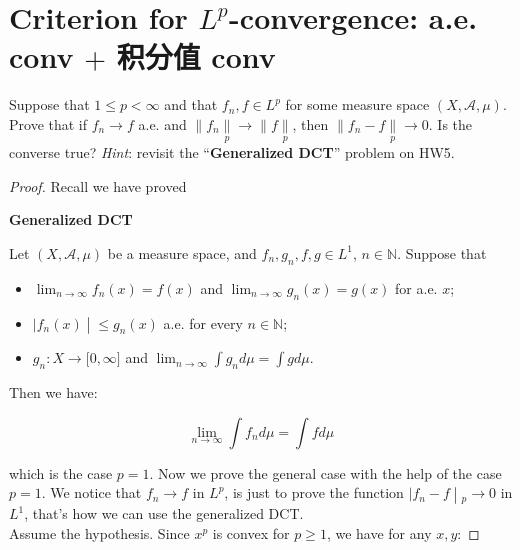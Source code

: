 \documentclass{qlnotes-export}
\begin{document}
\section{\texorpdfstring{Criterion for \(L^{p}\)-convergence: a.e. conv \(+\) 积分值 conv}{Criterion for L\^{}\{p\}-convergence: a.e. conv + 积分值 conv}}

Suppose that \(1 \leq p < \infty\) and that \(f_{n},f \in L^{p}\) for some measure space \((X,\mathcal{A},\mu)\). Prove that if \(f_{n}\rightarrow f\) a.e. and \(\parallel f_{n}\underset{p}{\parallel}\rightarrow \parallel f\underset{p}{\parallel}\), then \(\parallel f_{n} - f\underset{p}{\parallel}\rightarrow 0\). Is the converse true? \emph{Hint}: revisit the ``\textbf{Generalized DCT}'' problem on HW5.

\begin{proof}

Recall we have proved

\begin{theorem}{\protect{}\label{kn-generalized-dct}{\textbf{Generalized
DCT}}}

Let \((X,\mathcal{A},\mu)\) be a measure space, and \(f_{n},g_{n},f,g \in L^{1}\), \(n \in {\mathbb{N}}\). Suppose that

\begin{itemize}
\item
  \(\lim_{n\rightarrow\infty}f_{n}(x) = f(x)\) and \(\lim_{n\rightarrow\infty}g_{n}(x) = g(x)\) for a.e. \(x\);
\item
  \(\left. |f_{n}(x) \middle| \leq g_{n}(x) \right.\) a.e. for every \(n \in {\mathbb{N}}\);
\item
  \(g_{n}:X\rightarrow\lbrack 0,\infty\rbrack\) and \(\lim_{n\rightarrow\infty}\int g_{n} d\mu = \int g d\mu\).
\end{itemize}

Then we have:

\[\lim\limits_{n\rightarrow\infty}\int f_{n} d\mu = \int f d\mu\]

\end{theorem}

which is the case \(p = 1\). Now we prove the general case with the help of the case \(p = 1\). We notice that \(f_{n}\rightarrow f\) in \(L^{p}\), is just to prove the function \(\left. |f_{n} - f \middle| {}_{p}\rightarrow 0 \right.\) in \(L^{1}\), that's how we can use the generalized DCT.\\
Assume the hypothesis. Since \(x^{p}\) is convex for \(p \geq 1\), we have for any \(x,y\):


\end{proof}
\end{document}
